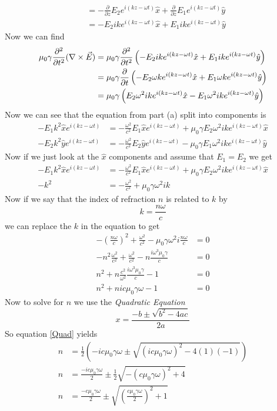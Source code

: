 \documentclass[11pt]{article}
\numberwithin{equation}{section}
\newcommand{\grad}{\bold\nabla}
\begin{document}
\begin{enumerate}[(a)]
\begin{align*}
&= -\frac{\partial}{\partial z}E_2e^{i(kz-\omega t)}\hat{x} + \frac{\partial}{\partial z}E_1e^{i(kz-\omega t)}\hat{y}\\
&=  -E_2ike^{i(kz-\omega t)}\hat{x} + E_1ike^{i(kz-\omega t)}\hat{y}
\end{align*}
Now we can find
\begin{align*}
\mu_0\gamma\frac{\partial^2}{\partial t^2}(\grad\times\vec{E}) &= \mu_0\gamma\frac{\partial^2}{\partial t^2}\left(-E_2ike^{i(kz-\omega t)}\hat{x} + E_1ike^{i(kz-\omega t)}\hat{y}\right) \\ 
&= \mu_0\gamma\frac{\partial}{\partial t}\left(-E_2\omega ke^{i(kz-\omega t)}\hat{x} + E_1\omega ke^{i(kz-\omega t)}\hat{y}\right) \\ 
&= \mu_0\gamma\left(E_2\omega^2ike^{i(kz-\omega t)}\hat{x} - E_1\omega^2ike^{i(kz-\omega t)}\hat{y}\right) 
\end{align*}
Now we can see that the equation from part (a) split into components is
\begin{align*}
-E_1k^2\hat{x}e^{i(kz-\omega t)} &= -\frac{\omega^2}{c^2}E_1\hat{x}e^{i(kz-\omega t)} + \mu_0\gamma E_2\omega^2ike^{i(kz-\omega t)}\hat{x}\\ 
-E_2k^2\hat{y}e^{i(kz-\omega t)} &= -\frac{\omega^2}{c^2}E_2\hat{y}e^{i(kz-\omega t)} - \mu_0\gamma E_1\omega^2ike^{i(kz-\omega t)}\hat{y}
\end{align*}
Now if we just look at the $\hat{x}$ components and assume that $E_1=E_2$ we get
\begin{align*}
-E_1k^2\hat{x}e^{i(kz-\omega t)} &= -\frac{\omega^2}{c^2}E_1\hat{x}e^{i(kz-\omega t)} + \mu_0\gamma E_2\omega^2ike^{i(kz-\omega t)}\hat{x}\\ 
-k^2 &= -\frac{\omega^2}{c^2} + \mu_0\gamma \omega^2ik 
\end{align*}
Now if we say that the index of refraction $n$ is related to $k$ by
$$k = \frac{n\omega}{c}$$
we can replace the $k$ in the equation to get
\begin{align*}
-\left(\frac{n\omega}{c}\right)^2 + \frac{\omega^2}{c^2} - \mu_0\gamma \omega^2i\frac{n\omega}{c} &= 0\\
-n^2\frac{\omega^2}{c^2} + \frac{\omega^2}{c^2} - n\frac{i\omega^3\mu_0\gamma}{c} &= 0\\
n^2 + n\frac{c^2}{\omega^2}\frac{i\omega^3\mu_0\gamma}{c} - 1 &= 0\\
n^2 + nic\mu_0\gamma\omega - 1 &= 0
\end{align*}
Now to solve for $n$ we use the \emph{Quadratic Equation}
\begin{equation}
x = \frac{-b\pm\sqrt{b^2-4ac}}{2a}
\label{Quad}
\end{equation}
So equation \ref{Quad} yields 
\begin{align*}
n &= \frac{1}{2}\left(-ic\mu_0\gamma\omega\pm\sqrt{\left(ic\mu_0\gamma\omega\right)^2 - 4(1)(-1)}\right)\\
n &= \frac{-ic\mu_0\gamma\omega}{2}\pm\frac{1}{2}\sqrt{-\left(c\mu_0\gamma\omega\right)^2 + 4}\\
n &= \frac{-c\mu_0\gamma\omega}{2}\pm\sqrt{\left(\frac{c\mu_0\gamma\omega}{2}\right)^2 + 1}
\end{align*}
\end{enumerate}
\end{document}
